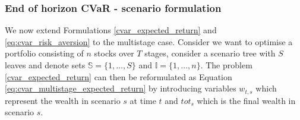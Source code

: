 \subsubsection{End of horizon CVaR - scenario formulation}
\label{section:endofhorizoncvar_scenario_formulation}
We now extend Formulations \ref{cvar_expected_return} and \ref{eq:cvar_risk_aversion} to the multistage case. Consider we want to optimise a portfolio consisting of $n$ stocks over $T$ stages, consider a scenario tree with $S$ leaves and denote sets $\mathbb{S}=\{1,\dots,S\}$ and $\mathbb{I}=\{1,\dots,n\}$. The problem \ref{cvar_expected_return} can then be reformulated as Equation \ref{eq:cvar_multistage_expected_return} by introducing variables $w_{t,s}$ which represent the wealth in scenario $s$ at time $t$ and $tot_s$ which is the final wealth in scenario $s$.

